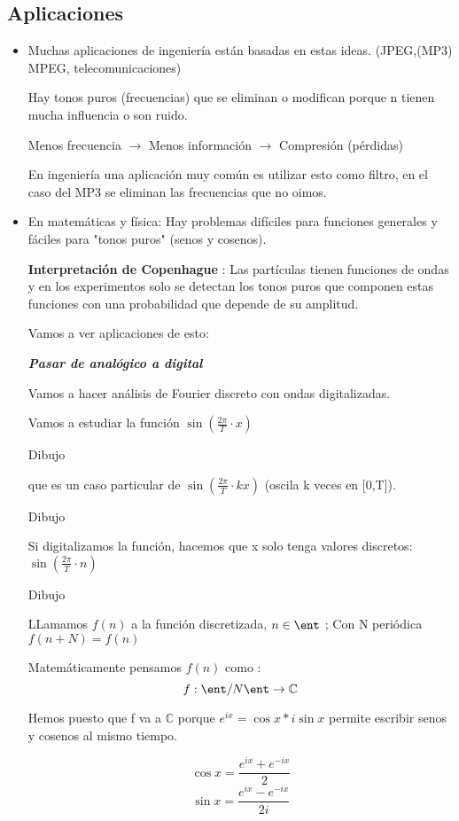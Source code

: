 \subsection{Aplicaciones}
\begin{itemize}
	\item Muchas aplicaciones de ingeniería están basadas en estas ideas. (JPEG,(MP3) MPEG, telecomunicaciones)
	
	Hay tonos puros (frecuencias) que se eliminan o modifican porque n tienen mucha influencia o son ruido.
	
	Menos frecuencia $\rightarrow$ Menos información $\rightarrow$ Compresión (pérdidas)
	
	En ingeniería una aplicación muy común es utilizar esto como filtro, en el caso del MP3 se eliminan las frecuencias que no oimos.
	
	\item En matemáticas y física: Hay problemas difíciles para funciones generales y fáciles para "tonos puros" (senos y cosenos).
	
		\textbf{Interpretación de Copenhague} : Las partículas tienen funciones de ondas y en los experimentos solo se detectan los tonos puros que componen estas funciones con una probabilidad que depende de su amplitud.
		
	Vamos a ver aplicaciones de esto:
	
	\textbf{\textit{Pasar de analógico a digital}}
	
	Vamos a hacer análisis de Fourier discreto con ondas digitalizadas.
	
	\begin{example}
		Vamos a estudiar la función $\sin\left(\frac{2\pi}{T}\cdot x\right)$
		
		Dibujo
		
		que es un caso particular de $\sin\left(\frac{2\pi}{T}\cdot k x\right)$ (oscila k veces en [0,T]).
		
		Dibujo
		
		Si digitalizamos la función, hacemos que x solo tenga valores discretos: $\sin\left(\frac{2\pi}{T}\cdot n\right)$
		
		Dibujo
		
		LLamamos $f(n)$ a la función discretizada, $n \in \ent$ ; Con N periódica $f(n + N) = f(n)$
		
		Matemáticamente pensamos $f(n)$ como :
		$$f : \ent/N\ent \rightarrow \mathbb{C} $$
	\end{example} 
	\obs Hemos puesto que f va a $\mathbb{C}$ porque $e^{ix} = \cos x * i\sin x$ permite escribir senos y cosenos al mismo tiempo.
	
	$$\cos x = \frac{e^{ix} + e^{-ix}}{2}$$
	$$\sin x = \frac{e^{ix} - e^{-ix}}{2i}$$
	
\end{itemize}

